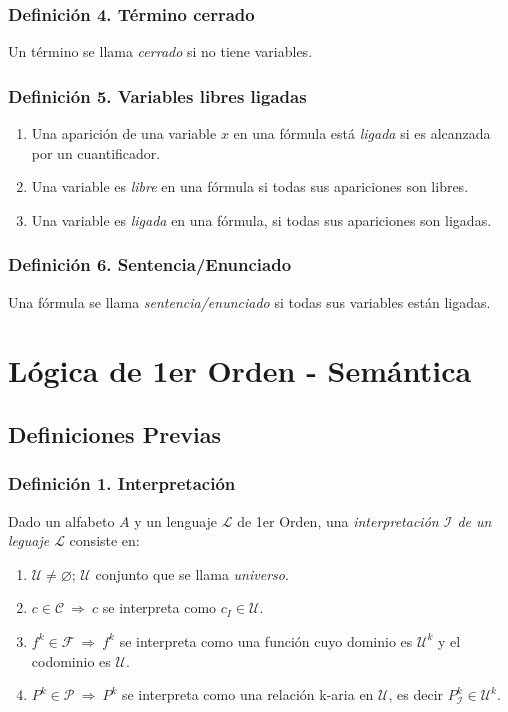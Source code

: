 \documentclass{article}
\newcommand{\partes}{\mathcal{P}}
\newcommand{\familia}{\mathcal{F}}                      %
\newcommand{\ctes}{\mathcal{C}}
\newcommand{\lenguaje}{\mathcal{L}}
\newcommand{\interpretacion}{\mathcal{I}}
\newcommand{\universo}{\mathcal{U}}
\newcommand{\Rightarrows}{\: \Rightarrow \:}            %
\begin{document}
\subsubsection*{Definición 4. Término cerrado}
Un término se llama \emph{cerrado} si no tiene variables.

\subsubsection*{Definición 5. Variables libres ligadas}
\begin{enumerate}
    \item Una aparición de una variable $x$ en una fórmula está \emph{ligada} si es alcanzada por un cuantificador.
    \item Una variable es \emph{libre} en una fórmula si todas sus apariciones son libres.
    \item Una variable es \emph{ligada} en una fórmula, si todas sus apariciones son ligadas.
\end{enumerate}

\subsubsection*{Definición 6. Sentencia/Enunciado}
Una fórmula se llama \emph{sentencia/enunciado} si todas sus variables están ligadas.


\newpage
\section{Lógica de 1er Orden - Semántica}
\subsection{Definiciones Previas}
\subsubsection*{Definición 1. Interpretación}
Dado un alfabeto $A$ y un lenguaje $\lenguaje$ de 1er Orden, una \emph{interpretación $\interpretacion$ de un  leguaje $\lenguaje$} consiste en:
\begin{enumerate}
    \item $\universo \neq \varnothing$; $\universo$ conjunto que se llama \emph{universo}.
    \item $c \in \ctes \Rightarrows c$ se interpreta como $c_I \in \universo$.
    \item $f^k \in \familia \Rightarrows f^k$ se interpreta como una función cuyo dominio es $\universo^k$ y el codominio es $\universo$.
    \item $P^k \in \partes \Rightarrows P^k$ se interpreta como una relación k-aria en $\universo$, es decir $P^k_\interpretacion \in \universo^k$. 
\end{enumerate}
\end{document}
